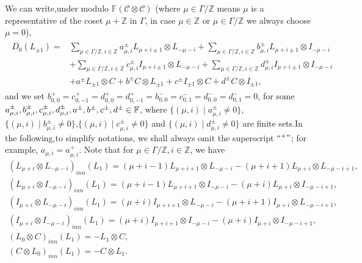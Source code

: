 \documentclass{amsart}
\theoremstyle{definition}
\theoremstyle{remark}
\numberwithin{equation}{subsection}
\numberwithin{equation}{section}
\begin{document}
We can write,under modulo $\mathbb{F}(\mathcal {C}\otimes \mathcal
{C})$ (where $\mu\in \Gamma/\mathbb{Z}$ means $\mu$ is a
representative of the coset $\mu+\mathbb{Z}$ in $\Gamma$, in case
$\mu\in \mathbb{Z}$ or $\mu \in \Gamma/\mathbb{Z}$ we always choose
$\mu=0$),
\begin{eqnarray}\label{equa2.9}
\begin{split}
D_0(L_{\pm 1})=&\underset{\mu\in \Gamma/\mathbb{Z},i\in
\mathbb{Z}}{\sum}{a^{\pm}_{\mu,i} L_{\mu+i\pm 1} \otimes
L_{-\mu-i}}+  \underset{\mu\in \Gamma/\mathbb{Z},i\in
\mathbb{Z}}{\sum}{b^{\pm}_{\mu,i}
L_{\mu+i\pm 1} \otimes I_{-\mu-i}}\\
&+\underset{\mu\in \Gamma/\mathbb{Z},i\in
\mathbb{Z}}{\sum}{c^{\pm}_{\mu,i} I_{\mu+i\pm 1} \otimes
L_{-\mu-i}}+  \underset{\mu\in \Gamma/\mathbb{Z},i\in
\mathbb{Z}}{\sum}{d^{\pm}_{\mu,i} I_{\mu+i\pm 1} \otimes
I_{-\mu-i}}\\ &+ a^{\pm }L_{\pm1}\otimes C+b^{\pm }C \otimes
L_{\pm1} +c^{\pm }I_{\pm1}\otimes C +d^{\pm }C \otimes I_{\pm1} ,
\end{split}
\end{eqnarray}
 and we set  $b^{+}_{0,0}=c^{+}_{0,-1}=d^{+}_{0,0}=
 d^{+}_{0,-1}=b^{-}_{0,0}=c^{-}_{0,1}=
 d^{-}_{0,0}=d^{-}_{0,1}=0$, for some
 $ a^{\pm}_{\mu,i},b^{\pm}_{\mu,i},c^{\pm}_{\mu,i},d^{\pm}_{\mu,i},
  a^{\pm},  \\
 b^{\pm },c^{\pm },d^{\pm } \in
  \mathbb{F} $, where $\{(\mu,i)\mid a^{\pm }_{\mu,i}\neq 0 \}$,  $\{(\mu,i)\mid b^{\pm }_{\mu,i}\neq 0
  \}$,$\{(\mu,i)\mid c^{\pm }_{\mu,i}\neq 0 \}$ and $\{(\mu,i)\mid d^{\pm}_{\mu,i}\neq 0 \}$
  are finite sets.In the following,to simplify notations, we shall
  always omit the superscript $``^+"$; for example,
  $a_{\mu,i}=a^+_{\mu,i}$. Note that for $\mu \in \Gamma/\mathbb{Z},i\in
  \mathbb{Z}$, we have
  $$\begin{array}{l}
  (L_{\mu+i} \otimes L_{-\mu-i})_{inn}(L_1)=(\mu+i-1)L_{\mu+i+1}\otimes L_{-\mu-i}
  -(\mu+i+1)L_{\mu+i}\otimes L_{-\mu-i+1},  \\[12pt]
  (L_{\mu+i} \otimes I_{-\mu-i})_{inn}(L_1)=(\mu+i-1)L_{\mu+i+1}\otimes I_{-\mu-i}
  -(\mu+i)L_{\mu+i}\otimes I_{-\mu-i+1},  \\[12pt]
  (I_{\mu+i} \otimes L_{-\mu-i})_{inn}(L_1)=(\mu+i)I_{\mu+i+1}\otimes L_{-\mu-i}
  -(\mu+i+1)I_{\mu+i}\otimes L_{-\mu-i+1},  \\[12pt]
 (I_{\mu+i} \otimes I_{-\mu-i})_{inn}(L_1)=(\mu+i)I_{\mu+i+1}\otimes I_{-\mu-i}
 -(\mu+i)I_{\mu+i}\otimes I_{-\mu-i+1},  \\[12pt]
 (L_0 \otimes C)_{inn}(L_1)=-L_1\otimes C,  \\[12pt]
  (C \otimes L_0)_{inn}(L_1)=-C\otimes L_1.  \\[12pt]
 \end{array}$$
\end{document}
